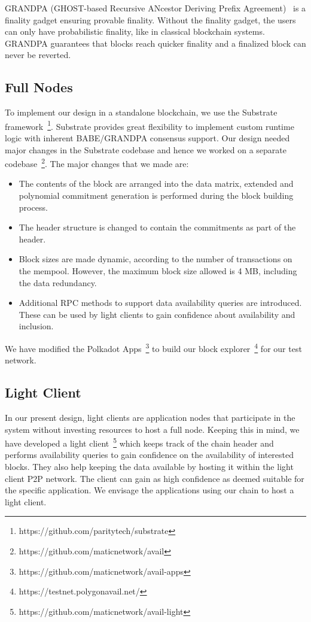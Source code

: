\documentclass[sigconf, screen=true, nonacm]{acmart}
\begin{document}
        GRANDPA (GHOST-based Recursive ANcestor Deriving Prefix Agreement)~\cite{grandpa} is a finality gadget ensuring provable finality. Without the finality gadget, the users can only have probabilistic finality, like in classical blockchain systems. GRANDPA guarantees that blocks reach quicker finality and a finalized block can never be reverted. 

    \subsection{Full Nodes}
        To implement our design in a standalone blockchain, we use the Substrate framework~\footnote{https://github.com/paritytech/substrate}. Substrate provides great flexibility to implement custom runtime logic with inherent BABE/GRANDPA consensus support. Our design needed major changes in the Substrate codebase and hence we worked on a separate codebase~\footnote{https://github.com/maticnetwork/avail}. The major changes that we made are:
        \begin{itemize}
            \item The contents of the block are arranged into the data matrix, extended and polynomial commitment generation is performed during the block building process. 
            \item The header structure is changed to contain the commitments as part of the header. 
            \item Block sizes are made dynamic, according to the number of transactions on the mempool. However, the maximum block size allowed is 4 MB, including the data redundancy.  
            \item Additional RPC methods to support data availability queries are introduced. These can be used by light clients to gain confidence about availability and inclusion.
        \end{itemize}
        We have modified the Polkadot Apps~\footnote{https://github.com/maticnetwork/avail-apps} to build our block explorer~\footnote{https://testnet.polygonavail.net/} for our test network. 

    \subsection{Light Client}
        In our present design, light clients are application nodes that participate in the system without investing resources to host a full node. Keeping this in mind, we have developed a light client~\footnote{https://github.com/maticnetwork/avail-light} which keeps track of the chain header and performs availability queries to gain confidence on the availability of interested blocks. They also help keeping the data available by hosting it within the light client P2P network. The client can gain as high confidence as deemed suitable for the specific application. We envisage the applications using our chain to host a light client.
\end{document}
